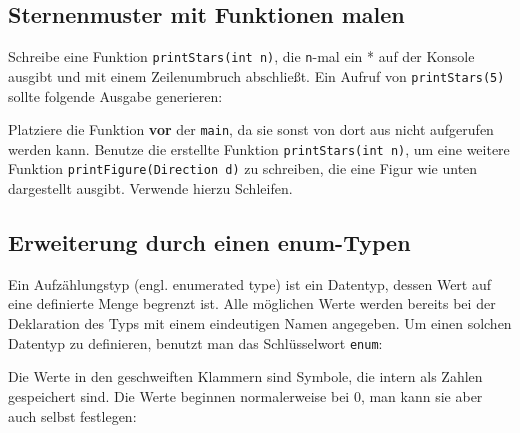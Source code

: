 \subsection{Sternenmuster mit Funktionen malen}

Schreibe eine Funktion \lstinline{printStars(int n)}, die \lstinline{n}-mal ein * auf der Konsole ausgibt und mit einem Zeilenumbruch abschließt.
Ein Aufruf von \lstinline{printStars(5)} sollte folgende Ausgabe generieren:



Platziere die Funktion \textbf{vor} der \lstinline{main}, da sie sonst von dort aus nicht aufgerufen werden kann.
Benutze die erstellte Funktion \lstinline{printStars(int n)}, um eine weitere Funktion \lstinline{printFigure(Direction d)} zu schreiben, die eine Figur wie unten dargestellt ausgibt.
Verwende hierzu Schleifen.




\subsection{Erweiterung durch einen enum-Typen}
\label{sec:basics_enumtype}
Ein Aufzählungstyp (engl. enumerated type) ist ein Datentyp, dessen Wert auf eine definierte Menge begrenzt ist. Alle möglichen Werte werden bereits bei der Deklaration des Typs mit einem eindeutigen Namen angegeben. Um einen solchen Datentyp zu definieren, benutzt man das Schlüsselwort \lstinline{enum}: 



Die Werte in den geschweiften Klammern sind Symbole, die intern als Zahlen gespeichert sind. Die Werte beginnen normalerweise bei 0, man kann sie aber auch selbst festlegen:

